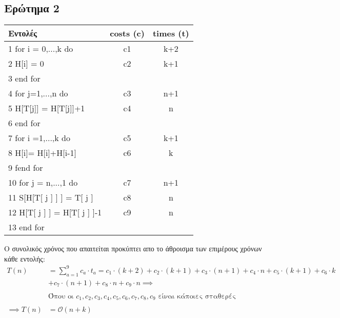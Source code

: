 \documentclass[a4paper]{article}
\begin{document}
\subsection*{\color{red}Ερώτημα 2}

\begin{center}
\begin{tabular}{|l|c|c|}
\hline
\color{blue}Εντολές & \color{blue}costs (c) & \color{blue}times (t) \\\hline
1 \hspace{5pt}	for i = 0,...,k do   & c1 & k+2\\\hline
2 \hspace{5pt}	H[i] = 0 & c2 & k+1 \\\hline
3 \hspace{5pt}	end for & & \\\hline
4 \hspace{5pt}	for j=1,...,n do & c3 & n+1 \\\hline 
5 \hspace{5pt}	H[T[j]] = H[T[j]]+1 & c4 & n  \\\hline
6 \hspace{5pt}	end for &  & \\\hline
7 \hspace{5pt}	for i =1,...,k do & c5 & k+1   \\\hline
8 \hspace{5pt}	H[i]= H[i]+H[i-1] & c6 & k \\\hline
9 \hspace{5pt}	fend for & &   \\\hline 
10\hspace{3pt}  for j = n,...,1 do & c7 & n+1 \\\hline
11\hspace{3pt}	S[H[T[ j ] ] ] = T[ j ] & c8 & n \\\hline
12\hspace{3pt}	H[T[ j ] ] = H[T[ j ] ]-1 & c9 & n \\\hline
13\hspace{3pt}	end for & &  \\\hline
\end{tabular}
\end{center}

Ο συνολικός χρόνος που απαιτείται προκύπτει απο το άθροισμα των επιμέρους χρόνων κάθε εντολής:
\begin{align*}
T(n)&= \sum_{a=1}^{9} c_a\cdot t_a =  c_1\cdot (k+2) + c_2\cdot (k+1) + c_3\cdot (n+1) + c_4\cdot n + c_5\cdot (k+1) + c_6\cdot k \\
    &+ c_7\cdot (n+1) + c_8\cdot n + c_9\cdot n \implies \\\\
&\text{Όπου οι $c_1,c_2,c_3,c_4,c_5,c_6,c_7,c_8,c_9$ είναι κάποιες σταθερές}\\\\
\implies T(n)&= \mathcal{O}(n+k)
\end{align*}
\end{document}
